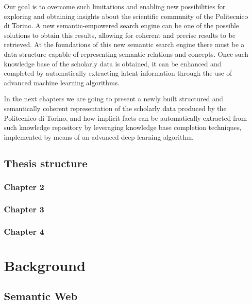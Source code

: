 \documentclass[%
    corpo=13.5pt,
    twoside,
    oldstyle,
    tipotesi=magistrale,
    greek,
    evenboxes
]{toptesi}
\begin{document}
Our goal is to overcome such limitations and enabling new possibilities for
exploring and obtaining insights about the scientific community of the
Politecnico di Torino. A new semantic-empowered search engine can be
one of the possible solutions to obtain this results, allowing for coherent and
precise results to be retrieved.
At the foundations of this new semantic search engine there must be a data
structure capable of representing semantic relations and concepts. Once such
knowledge base of the scholarly data is obtained, it can be enhanced and
completed by automatically extracting latent information through the use of
advanced machine learning algorithms.

In the next chapters we are going to present a newly built structured and
semantically coherent representation of the scholarly data produced by the
Politecnico di Torino, and how implicit facts can be automatically
extracted from such knowledge repository by leveraging knowledge base
completion techniques, implemented by means of an advanced deep learning
algorithm.


\section{Thesis structure}

\subsection{Chapter 2}

\subsection{Chapter 3}

\subsection{Chapter 4}




\chapter{Background}

\section{Semantic Web}
\end{document}

